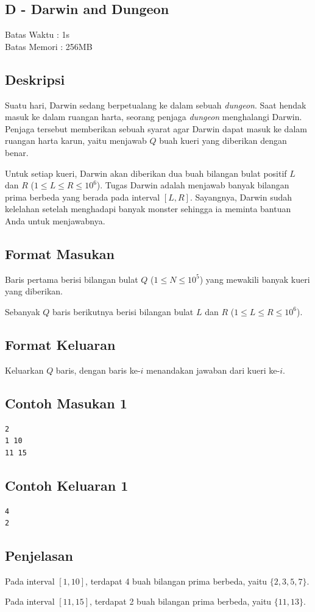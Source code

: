 \documentclass{article}
\begin{document}
\begin{center}
    \section*{D - Darwin and Dungeon} %
    Batas Waktu : 1s \\  %
    Batas Memori :  256MB \\ %
\end{center}

\subsection*{Deskripsi}

Suatu hari, Darwin sedang berpetualang ke dalam sebuah \textit{dungeon}. Saat hendak masuk ke dalam ruangan harta, seorang penjaga \textit{dungeon} menghalangi Darwin. Penjaga tersebut memberikan sebuah syarat agar Darwin dapat masuk ke dalam ruangan harta karun, yaitu menjawab $Q$ buah kueri yang diberikan dengan benar. 

Untuk setiap kueri, Darwin akan diberikan dua buah bilangan bulat positif $L$ dan $R$ ($ 1 \le L \le R \le 10^{6} $). Tugas Darwin adalah menjawab banyak bilangan prima berbeda yang berada pada interval $[L, R]$. Sayangnya, Darwin sudah kelelahan setelah menghadapi banyak monster sehingga ia meminta bantuan Anda untuk menjawabnya.

\subsection*{Format Masukan}
Baris pertama berisi bilangan bulat $Q$ ($1 \leq N \leq  10^5 $) yang mewakili banyak kueri yang diberikan.

Sebanyak $Q$ baris berikutnya berisi bilangan bulat $L$ dan $R$ ($ 1 \le L \le R \le 10^{6} $).

\subsection*{Format Keluaran}

Keluarkan $Q$ baris, dengan baris ke-$i$ menandakan jawaban dari kueri ke-$i$.
\\

\begin{multicols}{2}
\subsection*{Contoh Masukan 1}
\begin{lstlisting}
2
1 10
11 15
\end{lstlisting}
\columnbreak
\subsection*{Contoh Keluaran 1}
\begin{lstlisting}
4
2
\end{lstlisting}
\vfill
\null
\end{multicols}


\subsection*{Penjelasan}

Pada interval $[1, 10]$, terdapat 4 buah bilangan prima berbeda, yaitu $\{2, 3, 5, 7\}$.

Pada interval $[11, 15]$, terdapat 2 buah bilangan prima berbeda, yaitu $\{11, 13\}$.
\end{document}
